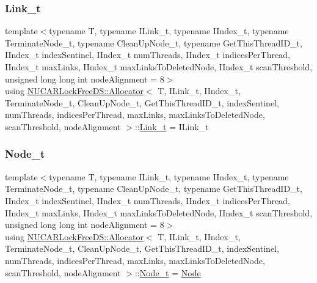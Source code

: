 \subsubsection{\texorpdfstring{Link\+\_\+t}{Link\_t}}
{\footnotesize\ttfamily template$<$typename T, typename I\+Link\+\_\+t, typename I\+Index\+\_\+t, typename Terminate\+Node\+\_\+t, typename Clean\+Up\+Node\+\_\+t, typename Get\+This\+Thread\+I\+D\+\_\+t, I\+Index\+\_\+t index\+Sentinel, I\+Index\+\_\+t num\+Threads, I\+Index\+\_\+t indices\+Per\+Thread, I\+Index\+\_\+t max\+Links, I\+Index\+\_\+t max\+Links\+To\+Deleted\+Node, I\+Index\+\_\+t scan\+Threshold, unsigned long long int node\+Alignment = 8$>$ \\
using \mbox{\hyperlink{class_n_u_c_a_r_lock_free_d_s_1_1_allocator}{N\+U\+C\+A\+R\+Lock\+Free\+D\+S\+::\+Allocator}}$<$ T, I\+Link\+\_\+t, I\+Index\+\_\+t, Terminate\+Node\+\_\+t, Clean\+Up\+Node\+\_\+t, Get\+This\+Thread\+I\+D\+\_\+t, index\+Sentinel, num\+Threads, indices\+Per\+Thread, max\+Links, max\+Links\+To\+Deleted\+Node, scan\+Threshold, node\+Alignment $>$\+::\mbox{\hyperlink{class_n_u_c_a_r_lock_free_d_s_1_1_allocator_a5508d82b795e6c1977bebb67b5e5b686}{Link\+\_\+t}} =  I\+Link\+\_\+t}

\mbox{\label{class_n_u_c_a_r_lock_free_d_s_1_1_allocator_ac44b7846713e20e26a7eede2492fda47}} 
\subsubsection{\texorpdfstring{Node\+\_\+t}{Node\_t}}
{\footnotesize\ttfamily template$<$typename T, typename I\+Link\+\_\+t, typename I\+Index\+\_\+t, typename Terminate\+Node\+\_\+t, typename Clean\+Up\+Node\+\_\+t, typename Get\+This\+Thread\+I\+D\+\_\+t, I\+Index\+\_\+t index\+Sentinel, I\+Index\+\_\+t num\+Threads, I\+Index\+\_\+t indices\+Per\+Thread, I\+Index\+\_\+t max\+Links, I\+Index\+\_\+t max\+Links\+To\+Deleted\+Node, I\+Index\+\_\+t scan\+Threshold, unsigned long long int node\+Alignment = 8$>$ \\
using \mbox{\hyperlink{class_n_u_c_a_r_lock_free_d_s_1_1_allocator}{N\+U\+C\+A\+R\+Lock\+Free\+D\+S\+::\+Allocator}}$<$ T, I\+Link\+\_\+t, I\+Index\+\_\+t, Terminate\+Node\+\_\+t, Clean\+Up\+Node\+\_\+t, Get\+This\+Thread\+I\+D\+\_\+t, index\+Sentinel, num\+Threads, indices\+Per\+Thread, max\+Links, max\+Links\+To\+Deleted\+Node, scan\+Threshold, node\+Alignment $>$\+::\mbox{\hyperlink{class_n_u_c_a_r_lock_free_d_s_1_1_allocator_ac44b7846713e20e26a7eede2492fda47}{Node\+\_\+t}} =  \mbox{\hyperlink{class_n_u_c_a_r_lock_free_d_s_1_1_allocator_1_1_node}{Node}}}

